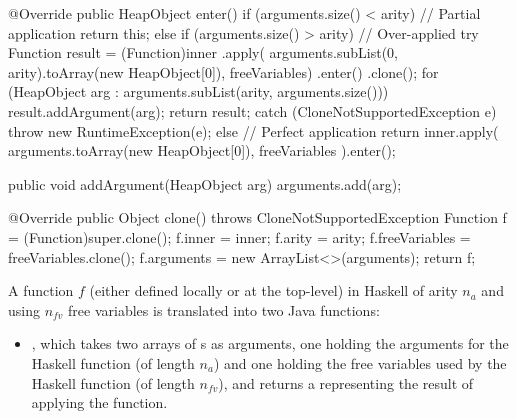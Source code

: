 \documentclass[dissertation.tex]{subfiles}
\begin{document}
{{{\begin{javafigure}
{                @Override
                public HeapObject enter() {
                    if (arguments.size() < arity) { // Partial application
                        return this;
                    }
                    else if (arguments.size() > arity) { // Over-applied
                        try {
                            Function result = (Function)inner
                                .apply(
                                    arguments.subList(0, arity).toArray(new HeapObject[0]),
                                    freeVariables)
                                .enter()
                                .clone();
                            for (HeapObject arg : arguments.subList(arity, arguments.size()))
                                result.addArgument(arg);
                            return result;
                        }
                        catch (CloneNotSupportedException e) {
                            throw new RuntimeException(e);
                        }
                    }
                    else { // Perfect application
                        return inner.apply(
                            arguments.toArray(new HeapObject[0]), freeVariables
                        ).enter();
                    }
                }
                            
                public void addArgument(HeapObject arg) {
                    arguments.add(arg);
                }
                            
                @Override
                public Object clone() throws CloneNotSupportedException {
                    Function f = (Function)super.clone();
                    f.inner = inner;
                    f.arity = arity;
                    f.freeVariables = freeVariables.clone();
                    f.arguments = new ArrayList<>(arguments);
                    return f;
                }
            }
            \end{javafigure}

            A function \(f\) (either defined locally or at the top-level) in Haskell of arity \(n_a\) and using
            \(n_{fv}\) free variables is translated into two Java functions:
            
            \begin{itemize}
            \item
            {
                
                , which takes two arrays of s as arguments, one holding the
                arguments for the Haskell function (of length \(n_a\)) and one holding the free variables used by
                the Haskell function (of length \(n_{fv}\)), and returns a  representing the result
                of applying the function.

}
\end{itemize}}}}
\end{document}
